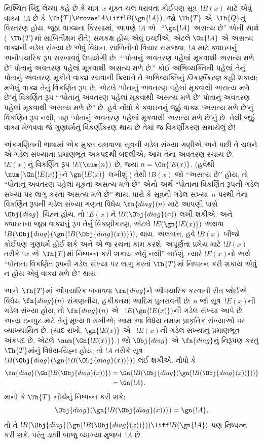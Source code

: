 \begin{explain}
નિશ્ચિત-બિંદુ લેમ્મા કહે છે કે
માત્ર~$x$ મુક્ત ચલ ધરાવતા કોઈપણ સૂત્ર~$!B(x)$ માટે
એવું વાક્ય~$!A$ છે કે
$\Th{T} \Proves !A \liff !B(\gn{!A})$,
જો $\Th{T}$ એ~$\Th{Q}$નું
વિસ્તરણ હોય. જૂઠા વાક્યના
કિસ્સામાં, આપણે $!A$ એ
~``$\gn{!A}$ અસત્ય છે''
એની સાથે (~$\Th{T}$માં
સાબિતીક્ષમ રીતે) સમકક્ષ
હોય એવું ઇચ્છીએ; એટલે
$\Gn{!A}$ એ અસત્ય
વાક્યની ગડેલ સંખ્યા
છે એવું વિધાન.
સાબિતીનો વિચાર સમજવા,
$!A$ માટે ક્વાઇનનું
અનૌપચારિક રૂપ સરખાવવું
ઉપયોગી છે: ``{}`પોતાનું
અવતરણ પહેલાં મૂકવાથી
અસત્ય મળે છે' પોતાનું
અવતરણ પહેલાં મૂકવાથી
અસત્ય મળે છે.'' કોઈ
અભિવ્યક્તિની પહેલાં તેનું
પોતાનું અવતરણ મૂકીને
વાક્ય રચવાની ક્રિયાને તે
અભિવ્યક્તિનું
\emph{વિકર્ણીકરણ} કહી શકાય;
મળેલું વાક્ય તેનું
વિકર્ણિત રૂપ છે.
એટલે `પોતાનું અવતરણ
પહેલાં મૂકવાથી અસત્ય મળે
છે'નું વિકર્ણિત રૂપ
``{}`પોતાનું અવતરણ પહેલાં
મૂકવાથી અસત્ય મળે છે'
પોતાનું અવતરણ પહેલાં
મૂકવાથી અસત્ય મળે છે'' છે.
હવે નોંધો કે ક્વાઇનનું
જૂઠું વાક્ય `અસત્ય મળે છે'નું
વિકર્ણિત રૂપ નથી, પણ
`પોતાનું અવતરણ પહેલાં
મૂકવાથી અસત્ય મળે છે'નું
છે. તેથી જૂઠું વાક્ય
મેળવવા જે ગુણધર્મનું
વિકર્ણીકરણ થાય છે તેમાં
જ વિકર્ણીકરણ સમાયેલું છે!{}

અંકગણિતની ભાષામાં એક
મુક્ત ચલવાળા સૂત્રની
ગડેલ સંખ્યા ગણીએ અને
પછી તે ચલને એ ગડેલ
સંખ્યાના પ્રમાણભૂત અંકપદથી
બદલીએ; આમ તેના અવતરણ
રચાય છે.
~$!E(x)$નું વિકર્ણિત
રૂપ $!E(\num{n})$ છે,
જ્યાં $n = \Gn{!E(x)}$.
(હવેથી $\num{\Gn{!E(x)}}$ને
$\gn{!E(x)}$ લખીશું.)
તેથી $!B(x)$ જો
``અસત્ય છે'' હોય,
તો ``પોતાનું અવતરણ પહેલાં
મૂકતાં અસત્ય મળે છે''
એનો અર્થ ``પોતાના
વિકર્ણિત રૂપની ગડેલ
સંખ્યા પર લાગુ કરતાં
અસત્ય મળે છે'' થાય.
ધારો કે સૂત્રની
ગડેલ સંખ્યા~$n$ પરથી
તેના વિકર્ણિત રૂપની
ગડેલ સંખ્યા ગણતા વિધેય
$\fn{diag}(n)$ માટે
આપણી પાસે
~$\Obj{diag}$ ચિહ્ન હોય.
તો $!E(x)$ને
$!B(\Obj{diag}(x))$
લખી શકીએ. અને ક્વાઇનના
જૂઠા વાક્યનું રૂપ તેનું
વિકર્ણીકરણ, એટલે
$!E(\gn{!E(x)})$ અથવા
$!B(\Obj{diag}(\gn{!B(\Obj{diag}(x))}))$,
થાય. અલબત્ત, હવે
$!B(x)$ બીજો કોઈપણ
ગુણધર્મ હોઈ શકે અને એ
જ રચના કામ કરશે.
અપૂર્ણતા પ્રમેય માટે
$!B(x)$ તરીકે
``$x$ એ~$\Th{T}$માં
નિષ્પન્ન કરી શકાય એવું નથી'' લઈશું.
ત્યારે $!E(x)$નો અર્થ
``પોતાના વિકર્ણિત રૂપની
ગડેલ સંખ્યા પર લાગુ
કરતાં $\Th{T}$માં
નિષ્પન્ન કરી શકાય એવું ન હોય એવું
વાક્ય મળે છે''
થાય.

આને~$\Th{T}$માં ઔપચારિક
બનાવવા $\fn{diag}$ને
ઔપચારિક કરવાની રીત
જોઈએ. વિધેય
$\fn{diag}(n)$ સંગણનીય,
હકીકતમાં આદિમ પુનરાવર્તી
છે: $n$ જો
સૂત્ર~$!E(x)$ની ગડેલ
સંખ્યા હોય, તો
$\fn{diag}(n)$ એ
~$!E(\gn{!E(x)})$ની
ગડેલ સંખ્યા આપે છે. અન્ય ઇનપુટ માટે તેનું મૂલ્ય
$0$ રાખીએ; આમ આ વિધેય તમામ પ્રાકૃતિક સંખ્યાઓ
પર વ્યાખ્યાયિત છે.
(યાદ રાખો,
$\gn{!E(x)}$ એ
~$!E(x)$ની ગડેલ સંખ્યાનું
પ્રમાણભૂત અંકપદ છે,
એટલે $\num{\Gn{!E(x)}}$.)
જો $\Obj{diag}$ એ
$\fn{diag}$નું નિરૂપણ
કરતું $\Th{T}$માંનું
વિધેય-ચિહ્ન હોય,
તો $!A$ તરીકે સૂત્ર
$!B(\Obj{diag}(\gn{!B(\Obj{diag}(x))}))$
લઈ શકીએ. નોંધો કે
\begin{align*}
\fn{diag}(\Gn{!B(\Obj{diag}(x))}) & =
\Gn{!B(\Obj{diag}(\gn{!B(\Obj{diag}(x))}))} \\
& = \Gn{!A}.
\end{align*}
માનો કે $\Th{T}$ નીચેનું
નિષ્પન્ન કરી શકે:
\[
\Obj{diag}(\gn{!B(\Obj{diag}(x))}) = \gn{!A},
\]
તો તે
$!B(\Obj{diag}(\gn{!B(\Obj{diag}(x))}))
\liff !B(\gn{!A})$
પણ નિષ્પન્ન કરી શકે.
પરંતુ ડાબી બાજુ
વ્યાખ્યા મુજબ~$!A$ છે.


\end{explain}
